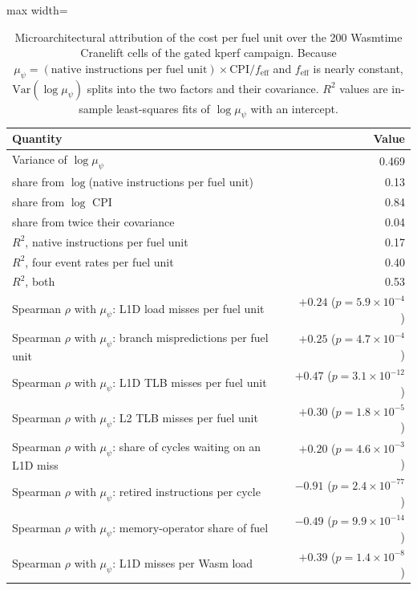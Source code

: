 \begin{table}[t]
\caption{Microarchitectural attribution of the cost per fuel unit over the 200 Wasmtime Cranelift cells of the gated kperf campaign. Because $\mu_\psi = (\text{native instructions per fuel unit})\times\mathrm{CPI}/f_{\mathrm{eff}}$ and $f_{\mathrm{eff}}$ is nearly constant, $\mathrm{Var}(\log\mu_\psi)$ splits into the two factors and their covariance. $R^2$ values are in-sample least-squares fits of $\log\mu_\psi$ with an intercept.}\label{tab:attribution}
\footnotesize
\setlength{\tabcolsep}{4pt}%
\begin{adjustbox}{max width=\textwidth}%
\begin{tabular}{lr}
\toprule
Quantity & Value \\
\midrule
Variance of $\log\mu_\psi$ & 0.469 \\
\quad share from $\log$(native instructions per fuel unit) & 0.13 \\
\quad share from $\log$ CPI & 0.84 \\
\quad share from twice their covariance & 0.04 \\
\midrule
$R^2$, native instructions per fuel unit & 0.17 \\
$R^2$, four event rates per fuel unit & 0.40 \\
$R^2$, both & 0.53 \\
\midrule
Spearman $\rho$ with $\mu_\psi$: L1D load misses per fuel unit & $+0.24$ ($p=5.9\times10^{-4}$) \\
Spearman $\rho$ with $\mu_\psi$: branch mispredictions per fuel unit & $+0.25$ ($p=4.7\times10^{-4}$) \\
Spearman $\rho$ with $\mu_\psi$: L1D TLB misses per fuel unit & $+0.47$ ($p=3.1\times10^{-12}$) \\
Spearman $\rho$ with $\mu_\psi$: L2 TLB misses per fuel unit & $+0.30$ ($p=1.8\times10^{-5}$) \\
Spearman $\rho$ with $\mu_\psi$: share of cycles waiting on an L1D miss & $+0.20$ ($p=4.6\times10^{-3}$) \\
Spearman $\rho$ with $\mu_\psi$: retired instructions per cycle & $-0.91$ ($p=2.4\times10^{-77}$) \\
Spearman $\rho$ with $\mu_\psi$: memory-operator share of fuel & $-0.49$ ($p=9.9\times10^{-14}$) \\
Spearman $\rho$ with $\mu_\psi$: L1D misses per Wasm load & $+0.39$ ($p=1.4\times10^{-8}$) \\
\bottomrule
\end{tabular}%
\end{adjustbox}
\end{table}
